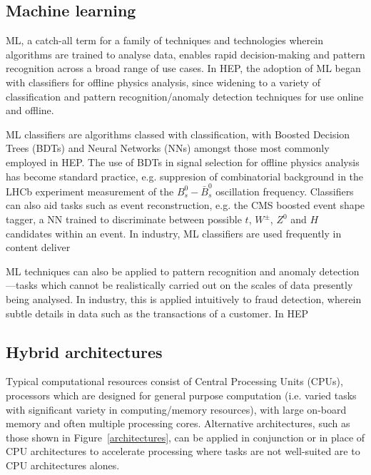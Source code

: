 \subsection{Machine learning}
\label{machine-learning}
ML, a catch-all term for a family of techniques and technologies wherein algorithms are trained to analyse data, enables rapid decision-making and pattern recognition across a broad range of use cases. \cite{intro-ml} In HEP, the adoption of ML began with classifiers for offline physics analysis, since widening to a variety of classification and pattern recognition/anomaly detection techniques for use online and offline. \cite{albertsson-ml}\par

ML classifiers are algorithms classed with classification, with Boosted Decision Trees (BDTs) and Neural Networks (NNs) amongst those most commonly employed in HEP. The use of BDTs in signal selection for offline physics analysis has become standard practice, e.g. suppresion of combinatorial background in the LHCb experiment measurement of the $B_s^0-\bar{B}_s^0$ oscillation frequency. \cite{delta-ms} Classifiers can also aid tasks such as event reconstruction, e.g. the CMS boosted event shape tagger, a NN trained to discriminate between possible $t$, $W^\pm$, $Z^0$ and $H$ candidates within an event. \cite{CMS-best} In industry, ML classifiers are used frequently in content deliver\par

ML techniques can also be applied to pattern recognition and anomaly detection—tasks which cannot be realistically carried out on the scales of data presently being analysed. In industry, this is applied intuitively to fraud detection, wherein subtle details in data such as the transactions of a customer. In HEP \cite{anomaly-hep}

\subsection{Hybrid architectures}
\label{hybrid-architectures}
Typical computational resources consist of Central Processing Units (CPUs), processors which are designed for general purpose computation (i.e. varied tasks with significant variety in computing/memory resources), with large on-board memory and often multiple processing cores. Alternative architectures, such as those shown in Figure~\ref{architectures}, can be applied in conjunction or in place of CPU architectures to accelerate processing where tasks are not well-suited are to CPU architectures alones. \par

